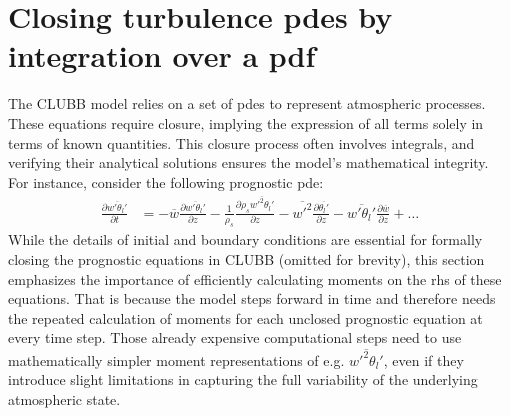 \section{Closing turbulence pdes by integration over a pdf}\label{sec:closing_pdes}

The \gls{CLUBB} model relies on a set of \glspl{pde} to represent atmospheric processes.
These equations require closure,
implying the expression of all terms solely in terms of known quantities.
This closure process often involves integrals,
and verifying their analytical solutions ensures the model's mathematical integrity.
For instance, consider the following prognostic {\gls{pde}\autocite[p. 21]{larson2022clubbsilhs}}:
\begin{align*}
    \frac{\partial \overline{w'\theta_l'}}{\partial t}
    &= -\overline{w}\frac{\partial \overline{w'\theta_l'}}{\partial z}
    - \frac{1}{\rho_s} \frac{\partial \rho_s \overline{w'^2 \theta_l'}}{\partial z}
    - \overline{w'^2} \frac{\partial \overline{\theta_l'}}{\partial z}
    - \overline{w'\theta_l'} \frac{\partial \overline{w}}{\partial z}
    + \ldots
\end{align*}
While the details of initial and boundary conditions are essential
for formally closing the prognostic equations in \gls{CLUBB} (omitted for brevity),
this section emphasizes the importance of efficiently calculating moments
on the \gls{rhs} of these equations.
That is because the model steps forward in time
and therefore needs the repeated calculation of moments
for each unclosed prognostic equation at every time step.
Those already expensive computational steps need to use mathematically simpler moment representations
of e.g. $\overline{w'^2 \theta_l'}$,
even if they introduce slight limitations
in capturing the full variability of the underlying atmospheric state.